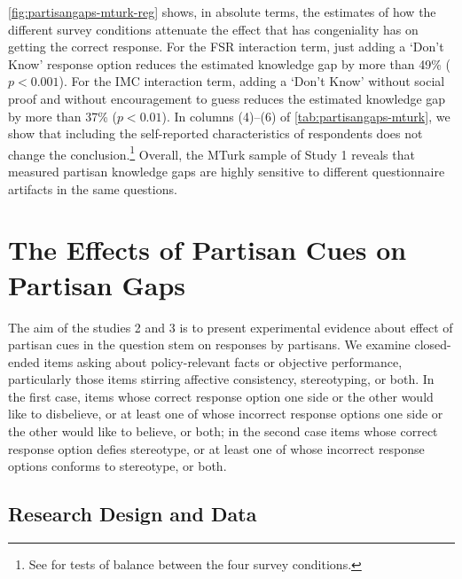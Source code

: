 \documentclass[12pt, letterpaper]{article}
\begin{document}
\cref{fig:partisangaps-mturk-reg} shows, in absolute terms, the estimates of how the different survey conditions attenuate the effect that has congeniality has on getting the correct response. For the FSR interaction term, just adding a `Don't Know' response option reduces the estimated knowledge gap by more than 49\% ($p<0.001$).
For the IMC interaction term, adding a `Don't Know' without social proof and without encouragement to guess reduces the estimated knowledge gap by more than 37\% ($p<0.01$).
In columns (4)--(6) of \cref{tab:partisangaps-mturk}, we show that including the self-reported characteristics of respondents does not change the conclusion.\footnote{See  for tests of balance between the four survey conditions.} Overall, the MTurk sample of Study 1 reveals that measured partisan knowledge gaps are highly sensitive to different questionnaire artifacts in the same questions.

\newpage

\section*{The Effects of Partisan Cues on Partisan Gaps}
\label{sec:partisan_cues}
The aim of the studies 2 and 3 is to present experimental evidence about effect of partisan cues in the question stem on responses by partisans. We examine closed-ended items asking about policy-relevant facts or objective performance, particularly those items stirring affective consistency, stereotyping, or both.  In the first case, items whose correct response option one side or the other would like to disbelieve, or at least one of whose incorrect response options one side or the other would like to believe, or both; in the second case items whose correct response option defies stereotype, or at least one of whose incorrect response options conforms to stereotype, or both.

\subsection*{Research Design and Data}\label{sec:data2}
\end{document}
